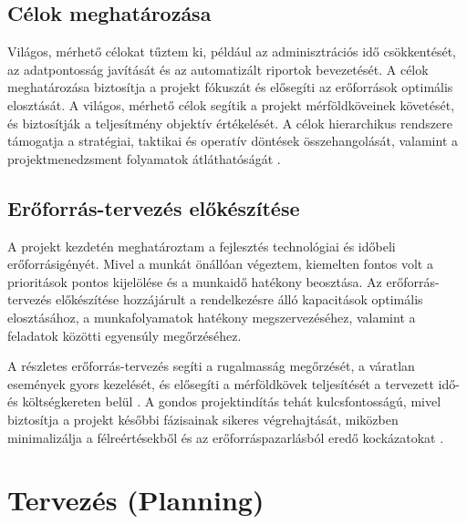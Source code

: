 \subsection{Célok meghatározása}

Világos, mérhető célokat tűztem ki, például az adminisztrációs idő csökkentését, az adatpontosság javítását és az automatizált riportok bevezetését.  
A célok meghatározása biztosítja a projekt fókuszát és elősegíti az erőforrások optimális elosztását.  
A világos, mérhető célok segítik a projekt mérföldköveinek követését, és biztosítják a teljesítmény objektív értékelését.
A célok hierarchikus rendszere támogatja a stratégiai, taktikai és operatív döntések összehangolását, valamint a projektmenedzsment folyamatok átláthatóságát \cite{Hajdu2014,Szalay2018}.

\subsection{Erőforrás-tervezés előkészítése}

A projekt kezdetén meghatároztam a fejlesztés technológiai és időbeli erőforrásigényét.  
Mivel a munkát önállóan végeztem, kiemelten fontos volt a prioritások pontos kijelölése és a munkaidő hatékony beosztása.  
Az erőforrás-tervezés előkészítése hozzájárult a rendelkezésre álló kapacitások optimális elosztásához, 
a munkafolyamatok hatékony megszervezéséhez, valamint a feladatok közötti egyensúly megőrzéséhez. 

A részletes erőforrás-tervezés segíti a rugalmasság megőrzését, a váratlan események gyors kezelését,  
és elősegíti a mérföldkövek teljesítését a tervezett idő- és költségkereten belül \cite{Kovacs2016,Kaposi2019,Hajdu2014}.  
A gondos projektindítás tehát kulcsfontosságú, mivel biztosítja a projekt későbbi fázisainak sikeres végrehajtását,  
miközben minimalizálja a félreértésekből és az erőforráspazarlásból eredő kockázatokat \cite{Szalay2018}.

\section{Tervezés (Planning)}

